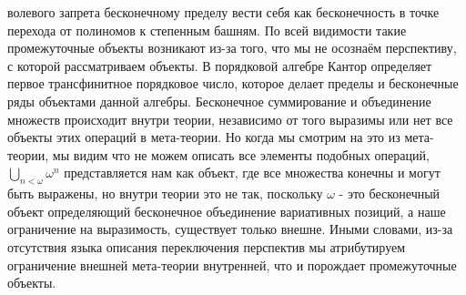 \documentclass[12pt]{article}
\begin{document}
волевого запрета бесконечному пределу вести себя как бесконечность в точке перехода от полиномов к степенным башням. По всей видимости такие промежуточные объекты возникают из-за того, что мы не осознаём перспективу, с которой рассматриваем объекты. В порядковой алгебре Кантор определяет первое трансфинитное порядковое число, которое делает пределы и бесконечные ряды объектами данной алгебры. Бесконечное суммирование и объединение множеств происходит внутри теории, независимо от того выразимы или нет все объекты этих операций в мета-теории. Но когда мы смотрим на это из мета-теории, мы видим что не можем описать все элементы подобных операций, $\bigcup_{n < \omega} \omega^n$ представляется нам как объект, где все множества конечны и могут быть выражены, но внутри теории это не так, поскольку $\omega$ - это бесконечный объект определяющий бесконечное объединение вариативных позиций, а наше ограничение на выразимость, существует только внешне. Иными словами, из-за отсутствия языка описания переключения перспектив мы атрибутируем ограничение внешней мета-теории внутренней, что и порождает промежуточные объекты.
\end{document}
